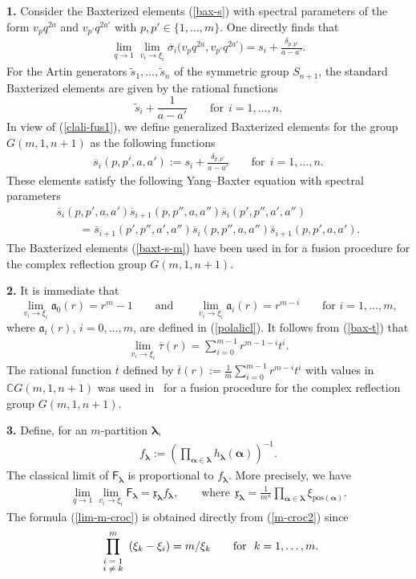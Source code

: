 \documentclass[pdftex]{sigma}
\newcommand{\pos}{{\mathrm{pos}}}
\newcommand{\bsi}{{\overline{\sigma}}}
\newcommand{\bta}{{\overline{\tau}}}
\newcommand{\lam}{\boldsymbol{\lambda}}
\newcommand{\alm}{\boldsymbol{\alpha}}
\begin{document}
{\bf 1.} Consider the Baxterized elements (\ref{bax-s}) with spectral parameters of the form $v_pq^{2a}$ and $v_{p'}q^{2a'}$ with
$p,p'\in\{1,\dots,m\}$. One directly f\/inds that
\begin{gather}\label{clali-fus1}
\lim_{q\to1}\lim_{v_i\to\xi_i}\bsi_i\big(v_pq^{2a},v_{p'}q^{2a'}
\big)=s_i+\frac{\delta_{p,p'}}{a-a'}  .
\end{gather}
For the Artin generators $\tilde{s}_1,\dots,\tilde{s}_n$ of the symmetric group $S_{n+1}$, the standard Baxterized
elements are given by the rational functions
\[
\tilde{s}_i+\frac{1}{a-a'}\qquad \text{for}\ \ i=1,\dots,n .
\]
In view of (\ref{clali-fus1}), we def\/ine generalized Baxterized elements for the group $G(m,1,n+1)$ as
the following functions
\begin{gather}\label{baxt-s-m}
\overline{s}_i(p,p',a,a'):=s_i+\frac{\delta_{p,p'}}{a-a'}\qquad \text{for} \ \ i=1,\dots,n .
\end{gather}
These elements satisfy the following Yang--Baxter equation with spectral parameters
\begin{gather*}
\overline{s}_i(p,p',a,a')\overline{s}_{i+1}(p,p'',a,a'')\overline{s}_{i}(p',p'',a',a'')\\
\qquad{}=\overline{s}_{i+1}(p',p'',a',a'')
\overline{s}_{i}(p,p'',a,a'')\overline{s}_{i+1}(p,p',a,a')  .
\end{gather*}
The Baxterized elements (\ref{baxt-s-m}) have been used in \cite{OPdA} for a fusion procedure for the complex ref\/lection group $G(m,1,n+1)$.

{\bf 2.} It is immediate that
\[
\lim_{v_i\to\xi_i}\mathfrak{a}_0(r)=r^m-1\qquad \text{and}\qquad \lim_{v_i\to\xi_i}\mathfrak{a}_i(r)=r^{m-i}\qquad  \text{for \ \ $i=1,\dots,m$,}
\]
where $\mathfrak{a}_i(r)$, $i=0,\dots,m$, are def\/ined in (\ref{polalicl}). It follows from (\ref{bax-t}) that
\begin{gather}\label{clali-fus2}
\lim_{v_i\to\xi_i}\bta(r)=\sum_{i=0}^{m-1}r^{m-1-i}t^i  .
\end{gather}
The rational function $\overline{t}$ def\/ined by $\overline{t}(r):=\frac{1}{m}\sum\limits_{i=0}^{m-1}r^{m-i}t^i$ with values in $\mathbb{C}G(m,1,n+1)$ was used in~\cite{OPdA} for a fusion procedure for the complex ref\/lection group $G(m,1,n+1)$.

{\bf 3.} Def\/ine, for an $m$-partition $\lam$,
\begin{gather*}%
f_{\lam}:=\left(\prod_{\alm\in\lam}h_{\lam}(\alm)\right)^{-1}.
\end{gather*}
The classical limit of $\mathsf{F}_{\lam}$ is proportional to $f_{\lam}$. More precisely, we have
\begin{gather}\label{lim-m-croc}
\lim_{q\to1}\lim_{v_i\to\xi_i}\mathsf{F}_{\lam}=\mathfrak{x}_{\lam}f_{\lam}  ,\qquad
\text{where}  \ \ \mathfrak{x}_{\lam}=\frac{1}{m^n}\prod_{\alm\in\lam} \xi_{\pos(\alm)}  .
\end{gather}
The formula (\ref{lim-m-croc}) is obtained directly from (\ref{m-croc2}) since
\[
\prod\limits_{\textrm{\scriptsize{$\begin{array}{c}i=1\\[-0.2em]i\neq k\end{array}$}}}^m (\xi_k-\xi_i)=m/\xi_k \qquad \text{for} \ \ k=1,\dots,m.
\]
\end{document}
